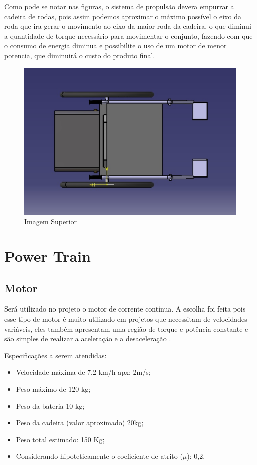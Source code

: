 Como pode se notar nas figuras, o sistema de propulsão devera empurrar a cadeira de rodas, pois assim podemos aproximar o máximo possível o eixo da roda que ira gerar o movimento ao eixo da maior roda da cadeira, o que diminui a quantidade de torque necessário para movimentar o conjunto, fazendo com que o consumo de energia diminua e possibilite o uso de um motor de menor potencia, que diminuirá o custo do produto final.

\begin{figure}[!htb]
\centering
\includegraphics[keepaspectratio=true,scale=0.4]{figuras/estrutura/vista_superior}
\caption{Imagem Superior}
\label{fig:superior}
\end{figure}

\section{Power Train}
\subsection{Motor}

Será utilizado no projeto o motor de corrente contínua. A escolha foi feita pois esse tipo de motor é muito utilizado em projetos que necessitam de velocidades variáveis, eles também apresentam uma região de torque e potência constante e são simples de realizar a aceleração e a desaceleração \cite{manual_bateria_unipower}.

Especificações a serem atendidas:
\begin{itemize}
 \item Velocidade máxima de 7,2 km/h apx: 2m/s;
 \item Peso máximo de 120 kg;
 \item Peso da bateria 10 kg;
 \item Peso da cadeira (valor aproximado) 20kg;
 \item Peso total estimado: 150 Kg;
 \item Considerando hipoteticamente o coeficiente de atrito ($\mu$): 0,2.
\end{itemize}

